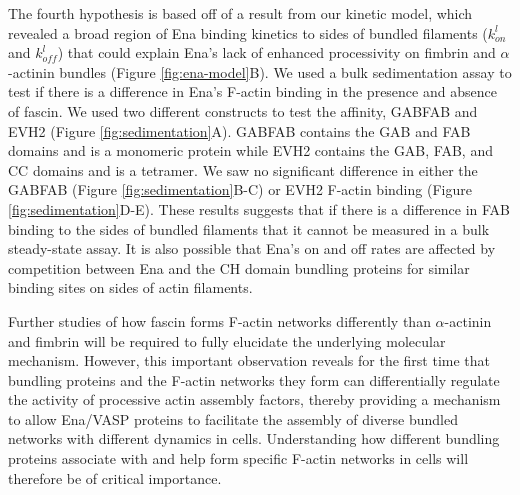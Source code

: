 The fourth hypothesis is based off of a result from our kinetic model, which revealed a broad region of Ena binding kinetics to sides of bundled filaments ($k_{on}^{l}$ and $k_{off}^{l}$) that could explain Ena's lack of enhanced processivity on fimbrin and $\alpha$-actinin bundles (Figure \ref{fig:ena-model}B). We used a bulk sedimentation assay to test if there is a difference in Ena's F-actin binding in the presence and absence of fascin. We used two different constructs to test the affinity, GABFAB and EVH2 (Figure \ref{fig:sedimentation}A). GABFAB contains the GAB and FAB domains and is a monomeric protein while EVH2 contains the GAB, FAB, and CC domains and is a tetramer. We saw no significant difference in either the GABFAB (Figure \ref{fig:sedimentation}B-C) or EVH2 F-actin binding (Figure \ref{fig:sedimentation}D-E). These results suggests that if there is a difference in FAB binding to the sides of bundled filaments that it cannot be measured in a bulk steady-state assay. It is also possible that Ena's on and off rates are affected by competition between Ena and the CH domain bundling proteins for similar binding sites on sides of actin filaments. 

Further studies of how fascin forms F-actin networks differently than $\alpha$-actinin and fimbrin will be required to fully elucidate the underlying molecular mechanism. However, this important observation reveals for the first time that bundling proteins and the F-actin networks they form can differentially regulate the activity of processive actin assembly factors, thereby providing a mechanism to allow Ena/VASP proteins to facilitate the assembly of diverse bundled networks with different dynamics in cells. Understanding how different bundling proteins associate with and help form specific F-actin networks in cells will therefore be of critical importance.

